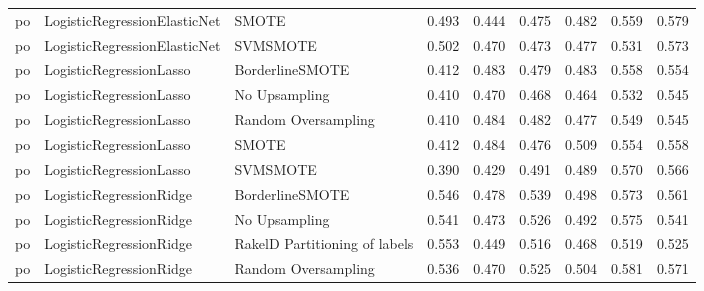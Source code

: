 \begin{tabular}{lllllllll}
      po &    LogisticRegressionElasticNet &                         SMOTE & 0.493 &                     0.444 &                 0.475 &                  0.482 &                                   0.559 &     0.579 \\
      po &    LogisticRegressionElasticNet &                      SVMSMOTE & 0.502 &                     0.470 &                 0.473 &                  0.477 &                                   0.531 &     0.573 \\
      po &         LogisticRegressionLasso &               BorderlineSMOTE & 0.412 &                     0.483 &                 0.479 &                  0.483 &                                   0.558 &     0.554 \\
      po &         LogisticRegressionLasso &                 No Upsampling & 0.410 &                     0.470 &                 0.468 &                  0.464 &                                   0.532 &     0.545 \\
      po &         LogisticRegressionLasso &           Random Oversampling & 0.410 &                     0.484 &                 0.482 &                  0.477 &                                   0.549 &     0.545 \\
      po &         LogisticRegressionLasso &                         SMOTE & 0.412 &                     0.484 &                 0.476 &                  0.509 &                                   0.554 &     0.558 \\
      po &         LogisticRegressionLasso &                      SVMSMOTE & 0.390 &                     0.429 &                 0.491 &                  0.489 &                                   0.570 &     0.566 \\
      po &         LogisticRegressionRidge &               BorderlineSMOTE & 0.546 &                     0.478 &                 0.539 &                  0.498 &                                   0.573 &     0.561 \\
      po &         LogisticRegressionRidge &                 No Upsampling & 0.541 &                     0.473 &                 0.526 &                  0.492 &                                   0.575 &     0.541 \\
      po &         LogisticRegressionRidge & RakelD Partitioning of labels & 0.553 &                     0.449 &                 0.516 &                  0.468 &                                   0.519 &     0.525 \\
      po &         LogisticRegressionRidge &           Random Oversampling & 0.536 &                     0.470 &                 0.525 &                  0.504 &                                   0.581 &     0.571 \\

\end{tabular}
